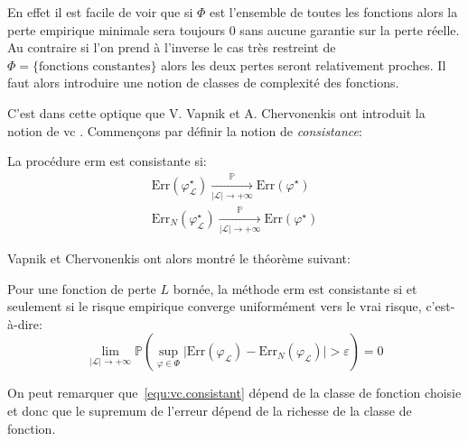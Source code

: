 En effet il est facile de voir que si $\Phi$ est l'ensemble de toutes les fonctions alors la perte empirique minimale sera toujours $0$ sans aucune garantie sur la perte réelle. Au contraire si l'on prend à l'inverse le cas très restreint de $\Phi = \{\text{fonctions constantes}\}$ alors les deux pertes seront relativement proches. Il faut alors introduire une notion de classes de complexité des fonctions.

C'est dans cette optique que V. Vapnik et A. Chervonenkis ont introduit la notion de \ac{vc} \citep{Vapnik1998,Vapnik2000}.
Commençons par définir la notion de \emph{consistance}:

\begin{definition}
    La procédure \ac{erm} est consistante si:
    \begin{align*}
        \mathrm{Err} \left( \varphi_{\mathcal{L}}^\star \right) \xrightarrow[\vert \mathcal{L} \vert \to +\infty]{\mathbb{P}} \mathrm{Err} ( \varphi^\star ) \\
        \mathrm{Err}_N \left( \varphi_{\mathcal{L}}^\star \right) \xrightarrow[\vert \mathcal{L} \vert \to +\infty]{\mathbb{P}} \mathrm{Err} ( \varphi^\star )
    \end{align*}
\end{definition}

Vapnik et Chervonenkis ont alors montré le théorème suivant:

\begin{theoreme}
    Pour une fonction de perte $L$ bornée, la méthode \ac{erm} est consistante si et seulement si le risque empirique converge uniformément vers le vrai risque, c'est-à-dire:
    \begin{equation}
        \lim_{\vert \mathcal{L} \vert \to +\infty} \mathbb{P} \left( \sup_{\varphi \in \Phi} \vert \mathrm{Err} ( \varphi_{\mathcal{L}} ) - \mathrm{Err}_N ( \varphi_{\mathcal{L}} ) \vert > \varepsilon \right) = 0 \label{equ:vc.consistant}
    \end{equation}
\end{theoreme}

On peut remarquer que~\ref{equ:vc.consistant} dépend de la classe de fonction choisie et donc que le supremum de l'erreur dépend de la richesse de la classe de fonction.

